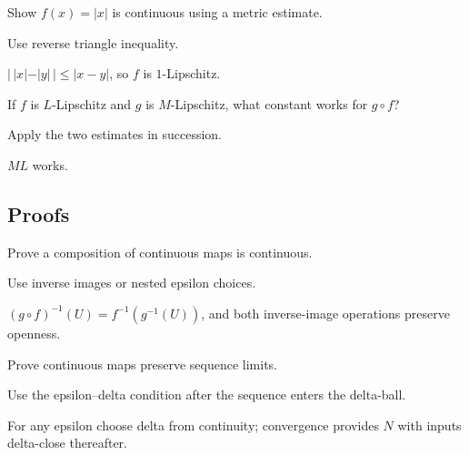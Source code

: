 \begin{exercise}\label{exr:ii05-expand-04}
Show \(f(x)=|x|\) is continuous using a metric estimate.
\end{exercise}
\begin{hint}
Use reverse triangle inequality.
\end{hint}
\begin{solution}
\(|\,|x|-|y|\,|\le|x-y|\), so \(f\) is \(1\)-Lipschitz.
\end{solution}

\begin{exercise}\label{exr:ii05-expand-05}
If \(f\) is \(L\)-Lipschitz and \(g\) is \(M\)-Lipschitz, what constant works for \(g\circ f\)?
\end{exercise}
\begin{hint}
Apply the two estimates in succession.
\end{hint}
\begin{solution}
\(ML\) works.
\end{solution}

\subsection*{Proofs}

\begin{exercise}\label{exr:ii05-expand-06}
Prove a composition of continuous maps is continuous.
\end{exercise}
\begin{hint}
Use inverse images or nested epsilon choices.
\end{hint}
\begin{solution}
\((g\circ f)^{-1}(U)=f^{-1}(g^{-1}(U))\), and both inverse-image operations preserve openness.
\end{solution}

\begin{exercise}\label{exr:ii05-expand-07}
Prove continuous maps preserve sequence limits.
\end{exercise}
\begin{hint}
Use the epsilon--delta condition after the sequence enters the delta-ball.
\end{hint}
\begin{solution}
For any epsilon choose delta from continuity; convergence provides \(N\) with inputs delta-close thereafter.
\end{solution}

